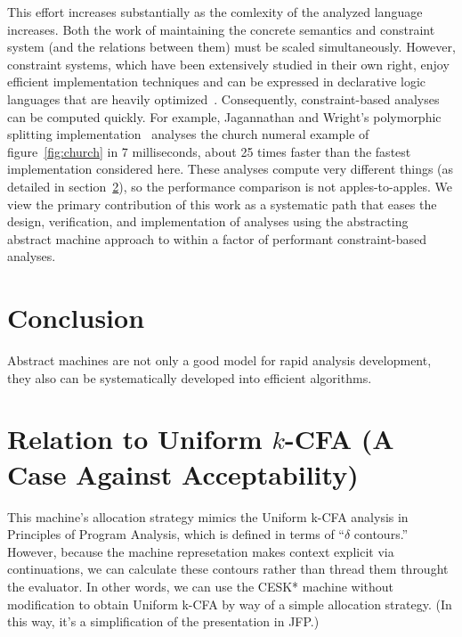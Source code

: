 \documentclass[preprint,onecolumn,9pt]{sigplanconf} %
\begin{document}
This effort increases substantially as the comlexity of the analyzed
language increases.  Both the work of maintaining the concrete
semantics and constraint system (and the relations between them) must
be scaled simultaneously.  However, constraint systems, which have
been extensively studied in their own right, enjoy efficient
implementation techniques and can be expressed in declarative logic
languages that are heavily
optimized~\cite{dvanhorn:bravenboer-smaragdakis-oopsla09}.
Consequently, constraint-based analyses can be computed quickly.  For
example, Jagannathan and Wright's polymorphic splitting
implementation~\cite{dvanhorn:wright-jagannathan-toplas98} analyses
the church numeral example of figure~\ref{fig:church} in 7
milliseconds, about 25 times faster than the fastest implementation
considered here.  These analyses compute very different things (as
detailed in section~\ref{sec:accept}), so the performance comparison
is not apples-to-apples.  We view the primary contribution of this
work as a systematic path that eases the design, verification, and
implementation of analyses using the abstracting abstract machine
approach to within a factor of performant constraint-based analyses.



\section{Conclusion}
\label{sec:conclusion}

Abstract machines are not only a good model for rapid analysis
development, they also can be systematically developed into efficient
algorithms.







\appendix
\section{Relation to Uniform \(k\)-CFA (A Case Against Acceptability)}
\label{sec:accept}

\cite{dvanhorn:nielson-nielson-popl97} \cite{dvanhorn:Neilson:1999}

This machine's allocation strategy mimics the Uniform k-CFA analysis
in Principles of Program Analysis, which is defined in terms of
``$\delta$ contours.''  However, because the machine represetation makes
context explicit via continuations, we can calculate these contours
rather than thread them throught the evaluator.  In other words, we
can use the CESK* machine without modification to obtain Uniform k-CFA
by way of a simple allocation strategy.  (In this way, it's a
simplification of the presentation in JFP.)
\end{document}
